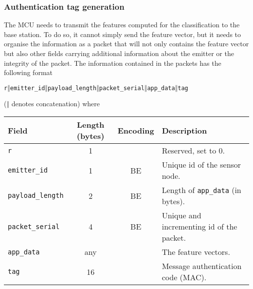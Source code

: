 \documentclass{article}
\begin{document}
\subsubsection{Authentication tag generation}

The MCU needs to transmit the features computed for the classification to the base station. To do so, it cannot simply send the feature vector, but it needs to organise the information as a packet that will not only contains the feature vector but also other fields carrying additional information about the emitter or the integrity of the packet. The information contained in the packets has the following format 
\begin{center}
\texttt{r$\mathbin\Vert$emitter\_id$\mathbin\Vert$payload\_length$\mathbin\Vert$packet\_serial$\mathbin\Vert$app\_data$\mathbin\Vert$tag}
\end{center}
(\texttt{$\mathbin\Vert$} denotes concatenation)
where
\begin{center}
\begin{tabular}{lccl}
    Field & Length (bytes) & Encoding & Description \\ \hline
    \texttt{r} & 1 & & Reserved, set to 0.\\
    \texttt{emitter\_id} & 1 & BE & Unique id of the sensor node.\\
    \texttt{payload\_length} & 2 & BE & Length of \texttt{app\_data} (in bytes).\\
    \texttt{packet\_serial} & 4 & BE & Unique and incrementing id of the packet. \\
    \texttt{app\_data} & any  &  & The feature vectors. \\
    \texttt{tag} & 16 & & Message authentication code (MAC). \\
\end{tabular}
\end{center}
\end{document}

